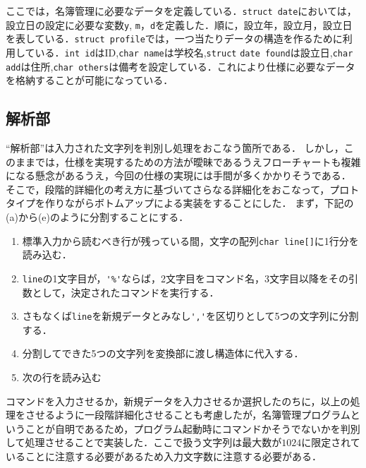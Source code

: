 \documentclass[a4j,11pt]{jarticle}
\begin{document}
ここでは，名簿管理に必要なデータを定義している．\verb|struct date|においては，設立日の設定に必要な変数\verb|y|, \verb|m|，\verb|d|を定義した．順に，設立年，設立月，設立日を表している．\verb|struct profile|では，一つ当たりデータの構造を作るために利用している．\verb|int id|はID,\verb|char name|は学校名,\verb|struct| \verb|date found|は設立日,\verb|char add|は住所,\verb|char others|は備考を設定している．これにより仕様に必要なデータを格納することが可能になっている．

\subsection{解析部} \label{sec:parse}

``解析部''は入力された文字列を判別し処理をおこなう箇所である．
しかし，このままでは，仕様を実現するための方法が曖昧であるうえフローチャートも複雑になる懸念があるうえ，今回の仕様の実現には手間が多くかかりそうである．
そこで，段階的詳細化の考え方に基づいてさらなる詳細化をおこなって，プロトタイプを作りながらボトムアップによる実装をすることにした．
まず，下記の(a)から(e)のように分割することにする．

\begin{enumerate}
\setlength{\parskip}{2pt} \setlength{\itemsep}{2pt}
\renewcommand{\labelenumi}{(\alph{enumi})} %
    \item 標準入力から読むべき行が残っている間，文字の配列\verb|char line[]|に1行分を読み込む．
    \item \verb|line|の1文字目が，\verb|'%'|ならば，2文字目をコマンド名，3文字目以降をその引数として，決定されたコマンドを実行する．
    \item さもなくば\verb|line|を新規データとみなし\verb|','|を区切りとして5つの文字列に分割する．
    \item 分割してできた5つの文字列を変換部に渡し構造体に代入する．
    \item 次の行を読み込む
\end{enumerate}
コマンドを入力させるか，新規データを入力させるか選択したのちに，以上の処理をさせるように一段階詳細化させることも考慮したが，名簿管理プログラムということが自明であるため，プログラム起動時にコマンドかそうでないかを判別して処理させることで実装した．ここで扱う文字列は最大数が$1024$に限定されていることに注意する必要があるため入力文字数に注意する必要がある．
\end{document}
